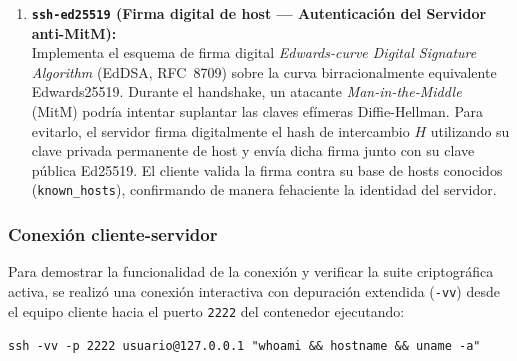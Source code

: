 \documentclass[letter,12pt]{article}
\begin{document}
\begin{enumerate}
    \item \textbf{\texttt{ssh-ed25519} (Firma digital de host — Autenticación del Servidor anti-MitM):}\\
    Implementa el esquema de firma digital \textit{Edwards-curve Digital Signature Algorithm} (EdDSA, RFC~8709) sobre la curva birracionalmente equivalente Edwards25519. Durante el handshake, un atacante \textit{Man-in-the-Middle} (MitM) podría intentar suplantar las claves efímeras Diffie-Hellman. Para evitarlo, el servidor firma digitalmente el hash de intercambio $H$ utilizando su clave privada permanente de host y envía dicha firma junto con su clave pública Ed25519. El cliente valida la firma contra su base de hosts conocidos (\texttt{known\_hosts}), confirmando de manera fehaciente la identidad del servidor.
\end{enumerate}

\begin{table}[H]
\centering
\caption{Resumen comparativo de la suite criptográfica configurada en OpenSSH.}
\label{tab:resumen_ssh_algs}
\end{table}

\subsubsection{Conexión cliente-servidor}

Para demostrar la funcionalidad de la conexión y verificar la suite criptográfica activa, se realizó una conexión interactiva con depuración extendida (\texttt{-vv}) desde el equipo cliente hacia el puerto \texttt{2222} del contenedor ejecutando:
\begin{center}
    \texttt{ssh -vv -p 2222 usuario@127.0.0.1 "whoami \&\& hostname \&\& uname -a"}
\end{center}
\end{document}
